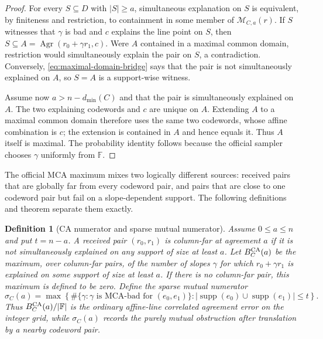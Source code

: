 \documentclass[11pt,a4paper]{amsart}
\numberwithin{equation}{section}
\newtheorem{definition}[definition]{Definition}
\theoremstyle{remark}
\DeclareMathOperator{\supp}{supp}
\newcommand{\F}{\mathbb F}
\newcommand{\abs}[1]{\lvert #1\rvert}
\begin{document}
\begin{proof}
For every \(S\subseteq D\) with \(\abs S\ge a\), simultaneous
explanation on \(S\) is equivalent, by finiteness and restriction, to
containment in some member of \(\mathcal M_{C,a}(r)\).  If \(S\) witnesses
that \(\gamma\) is bad and \(c\) explains the line point on \(S\), then
\(S\subseteq A=\operatorname{Agr}(r_0+\gamma r_1,c)\).  Were \(A\)
contained in a maximal common domain, restriction would simultaneously
explain the pair on \(S\), a contradiction.  Conversely,
\eqref{eq:maximal-domain-bridge} says that the pair is not simultaneously
explained on \(A\), so \(S=A\) is a support-wise witness.

Assume now \(a>n-d_{\min}(C)\) and that the pair is simultaneously
explained on \(A\).  The two explaining codewords and \(c\) are unique on
\(A\).  Extending \(A\) to a maximal common domain therefore uses the same
two codewords, whose affine combination is \(c\); the extension is contained
in \(A\) and hence equals it.  Thus \(A\) itself is maximal.  The probability
identity follows because the official sampler chooses \(\gamma\) uniformly
from \(\F\).
\end{proof}

The official MCA maximum mixes two logically different sources: received
pairs that are globally far from every codeword pair, and pairs that are
close to one codeword pair but fail on a slope-dependent support.  The
following definitions and theorem separate them exactly.

\begin{definition}[CA numerator and sparse mutual numerator]
\label{def:ca-sparse-numerators}
Assume \(0\le a\le n\) and put \(t=n-a\).  A received pair
\((r_0,r_1)\) is \emph{column-far at
agreement \(a\)} if it is not simultaneously explained on any support of
size at least \(a\).  Let \(B_C^{\rm CA}(a)\) be the maximum, over
column-far pairs, of the number of slopes \(\gamma\) for which
\(r_0+\gamma r_1\) is explained on some support of size at least \(a\).
If there is no column-far pair, this maximum is defined to be zero.
Define the \emph{sparse mutual numerator}
\[
 \sigma_C(a)=\max\left\{
 \#\{\gamma:\gamma\text{ is MCA-bad for }(e_0,e_1)\}:
 \abs{\supp(e_0)\cup\supp(e_1)}\le t\right\}.
 \tag{SP1}\label{eq:sparse-mutual-numerator}
\]
Thus \(B_C^{\rm CA}(a)/\abs\F\) is the ordinary affine-line correlated
agreement error on the integer grid, while \(\sigma_C(a)\) records the
purely mutual obstruction after translation by a nearby codeword pair.
\end{definition}
\end{document}
